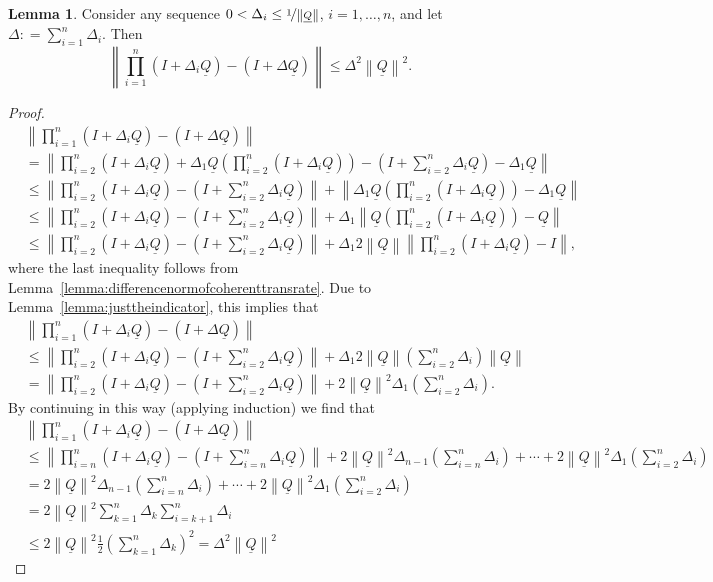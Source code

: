 \documentclass[10pt]{paper}
\theoremstyle{definition}
\newtheorem{lemma}[theorem]{Lemma}
\newcommand{\lrate}{\underline{Q}}
\newcommand{\norm}[1]{\left\lVert #1 \right\rVert}
\newcommand{\coloneqq}{:\!=}
\begin{document}
\begin{lemma}\label{lemma:justthelinearpart_appendix}
Consider any sequence $0<\Delta_i\leq\nicefrac{1}{\norm{\lrate}}$, $i=1,\dots,n$, and let $\Delta\coloneqq\sum_{i=1}^n\Delta_i$. Then
\begin{equation*}
\norm{\prod_{i=1}^n(I+\Delta_i\lrate)-(I+\Delta\lrate)}\leq\Delta^2\norm{\lrate}^2.
\end{equation*}
\end{lemma}
\begin{proof}
\begin{align*}
&\norm{\prod_{i=1}^n(I+\Delta_i\lrate)-(I+\Delta\lrate)}\\
&=\norm{\prod_{i=2}^n(I+\Delta_i\lrate)+\Delta_1\lrate\left(\prod_{i=2}^n(I+\Delta_i\lrate)\right)-(I+\sum_{i=2}^n\Delta_i\lrate)-\Delta_1\lrate}\\
&\leq\norm{\prod_{i=2}^n(I+\Delta_i\lrate)-(I+\sum_{i=2}^n\Delta_i\lrate)}+\norm{\Delta_1\lrate\left(\prod_{i=2}^n(I+\Delta_i\lrate)\right)-\Delta_1\lrate}\\
&\leq\norm{\prod_{i=2}^n(I+\Delta_i\lrate)-(I+\sum_{i=2}^n\Delta_i\lrate)}+\Delta_1\norm{\lrate\left(\prod_{i=2}^n(I+\Delta_i\lrate)\right)-\lrate}\\
&\leq\norm{\prod_{i=2}^n(I+\Delta_i\lrate)-(I+\sum_{i=2}^n\Delta_i\lrate)}+\Delta_1 2\norm{\lrate}\norm{\prod_{i=2}^n(I+\Delta_i\lrate)-I},
\end{align*}
where the last inequality follows from Lemma~\ref{lemma:differencenormofcoherenttransrate}. Due to Lemma~\ref{lemma:justtheindicator}, this implies that
\begin{align*}
&\norm{\prod_{i=1}^n(I+\Delta_i\lrate)-(I+\Delta\lrate)}\\
&\leq\norm{\prod_{i=2}^n(I+\Delta_i\lrate)-(I+\sum_{i=2}^n\Delta_i\lrate)}+\Delta_1 2\norm{\lrate}\left(\sum_{i=2}^n\Delta_i\right)\norm{\lrate}\\
&=\norm{\prod_{i=2}^n(I+\Delta_i\lrate)-(I+\sum_{i=2}^n\Delta_i\lrate)}+2\norm{\lrate}^2\Delta_1\left(\sum_{i=2}^n\Delta_i\right).
\end{align*}
By continuing in this way (applying induction) we find that
\begin{align*}
&\norm{\prod_{i=1}^n(I+\Delta_i\lrate)-(I+\Delta\lrate)}\\
&\leq
\norm{\prod_{i=n}^n(I+\Delta_i\lrate)-(I+\sum_{i=n}^n\Delta_i\lrate)}
+2\norm{\lrate}^2\Delta_{n-1}\left(\sum_{i=n}^n\Delta_i\right)
+\cdots
+2\norm{\lrate}^2\Delta_1\left(\sum_{i=2}^n\Delta_i\right)\\
&=2\norm{\lrate}^2\Delta_{n-1}\left(\sum_{i=n}^n\Delta_i\right)
+\cdots
+2\norm{\lrate}^2\Delta_1\left(\sum_{i=2}^n\Delta_i\right)\\
&=2\norm{\lrate}^2\sum_{k=1}^n\Delta_k\sum_{i=k+1}^n\Delta_i\\
&\leq2\norm{\lrate}^2\frac{1}{2}\left(\sum_{k=1}^n\Delta_k\right)^2=\Delta^2\norm{\lrate}^2
\end{align*}
\end{proof}
\end{document}
